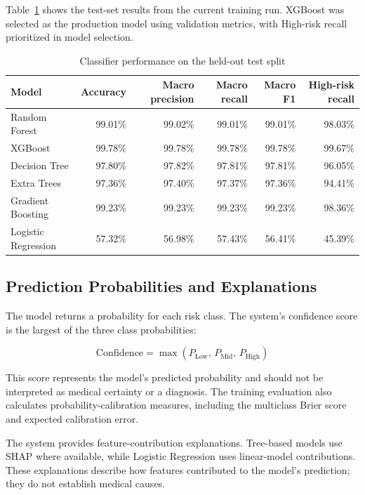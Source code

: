 Table~\ref{tab:model-performance} shows the test-set results from the
current training run. XGBoost was selected as the production model using
validation metrics, with High-risk recall prioritized in model selection.

\begin{table}[htbp]
\centering
\small
\caption{Classifier performance on the held-out test split}
\label{tab:model-performance}
\begin{tabular}{lrrrrr}
\hline
Model & Accuracy & Macro precision & Macro recall & Macro F1 & High-risk recall \\
\hline
Random Forest       & 99.01\% & 99.02\% & 99.01\% & 99.01\% & 98.03\% \\
XGBoost             & 99.78\% & 99.78\% & 99.78\% & 99.78\% & 99.67\% \\
Decision Tree       & 97.80\% & 97.82\% & 97.81\% & 97.81\% & 96.05\% \\
Extra Trees         & 97.36\% & 97.40\% & 97.37\% & 97.36\% & 94.41\% \\
Gradient Boosting   & 99.23\% & 99.23\% & 99.23\% & 99.23\% & 98.36\% \\
Logistic Regression & 57.32\% & 56.98\% & 57.43\% & 56.41\% & 45.39\% \\
\hline
\end{tabular}
\end{table}

\subsection{Prediction Probabilities and Explanations}

The model returns a probability for each risk class. The system's
confidence score is the largest of the three class probabilities:

\begin{equation}
    \text{Confidence} =
    \max(P_{\text{Low}},\, P_{\text{Mid}},\, P_{\text{High}})
    \label{eq:confidence}
\end{equation}

This score represents the model's predicted probability and should not
be interpreted as medical certainty or a diagnosis. The training
evaluation also calculates probability-calibration measures, including
the multiclass Brier score and expected calibration error.

The system provides feature-contribution explanations. Tree-based models
use SHAP where available, while Logistic Regression uses linear-model
contributions. These explanations describe how features contributed to
the model's prediction; they do not establish medical causes.

